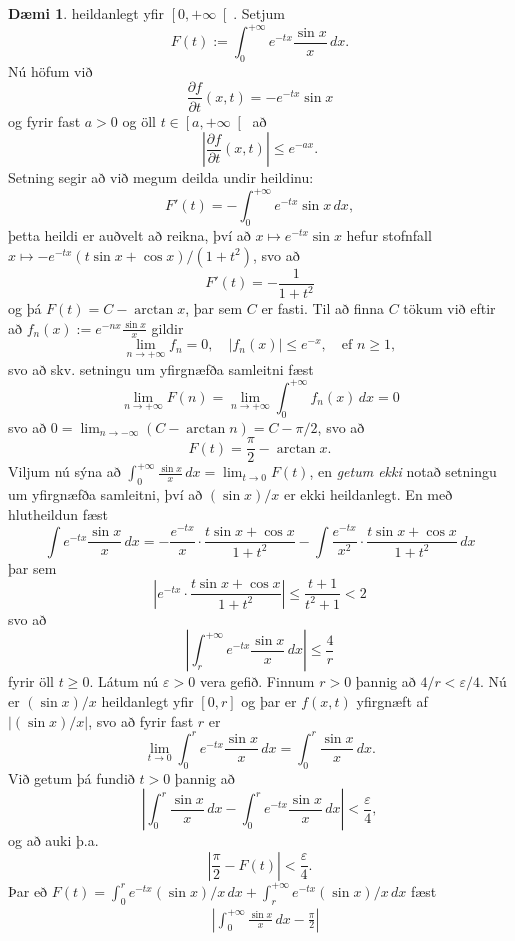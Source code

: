 \documentclass[a4paper,icelandic,11pt]{book}
\theoremstyle{plain}      \newtheorem{setn}{Setning}[chapter]
\theoremstyle{definition} \newtheorem{skilgr}[setn]{Skilgreining}
\newtheorem{daemi}[setn]{Dæmi}
\theoremstyle{remark}     \newtheorem*{ath}{Athugasemd}
\begin{document}
\begin{daemi}
  heildanlegt yfir $\left[0,+\infty\right[$. Setjum
  \[
  F(t) := \int_{0}^{+\infty}e^{-tx}\frac{\sin x}x\,dx.
  \]
  Nú höfum við 
  \[
  \frac{\partial f}{\partial t}(x,t) = -e^{-tx}\sin x
  \]
  og fyrir fast $a>0$ og öll $t\in\left[a,+\infty\right[$ að
  \[
  \left|
    \frac{\partial f}{\partial t}(x,t)
  \right|
  \le e^{-ax}.
  \]
  Setning segir að við megum deilda undir heildinu:
  \[
  F'(t) = -\int_{0}^{+\infty}e^{-tx}\sin x\,dx,
  \]
  þetta heildi er auðvelt að reikna, því að $x\mapsto e^{-tx}\sin x$
  hefur stofnfall $x\mapsto -e^{-tx}(t\sin x + \cos x)/(1+t^{2})$, svo
  að
  \[
  F'(t) = -\frac 1{1+t^{2}}
  \]
  og þá $F(t) = C - \arctan x$, þar sem $C$ er fasti. Til að finna $C$
  tökum við eftir að $f_{n}(x):=e^{-nx}\frac{\sin x}x$ gildir
  \[
  \lim_{n\to+\infty}f_{n} = 0,
  \quad |f_{n}(x)|\le e^{-x},
  \quad \text{ef }n\ge 1,
  \]
  svo að skv. setningu um yfirgnæfða samleitni fæst
  \[
  \lim_{n\to+\infty} F(n)
  = \lim_{n\to+\infty}\int_{0}^{+\infty}f_{n}(x)\,dx
  = 0
  \]
  svo að $0=\lim_{n\to -\infty}(C-\arctan n)=C-\pi/2$, svo að
  \[
  F(t) = \frac \pi2 - \arctan x.
  \]
  Viljum nú sýna að $\int_{0}^{+\infty}\frac{\sin x}x\,dx=\lim_{t\to
    0}F(t)$, en \emph{getum ekki} notað setningu um yfirgnæfða
  samleitni, því að $(\sin x)/x$ er ekki heildanlegt. En með
  hlutheildun fæst
  \[
  \int e^{-tx}\frac{\sin x}x\,dx
  = -\frac{e^{-tx}}x \cdot \frac{t\sin x + \cos x}{1+t^{2}}
  - \int \frac{e^{-tx}}{x^{2}}\cdot \frac{t\sin x + \cos x}{1+t^{2}}\,dx
  \]
  þar sem
  \[
  \left|
    e^{-tx}\cdot
    \frac{t\sin x + \cos x}{1+t^{2}}
  \right|
  \le \frac{t+1}{t^{2}+1}
  < 2
  \]
  svo að
  \[
  \left|
    \int_{r}^{+\infty}e^{-tx}
    \frac{\sin x}x\,dx
  \right|
  \le \frac 4r
  \]
  fyrir öll $t\ge 0$. Látum nú $\varepsilon > 0$ vera gefið. Finnum
  $r>0$ þannig að $4/r < \varepsilon/4$. Nú er $(\sin x)/x$
  heildanlegt yfir $[0,r]$ og þar er $f(x,t)$ yfirgnæft af
  $|(\sin{x})/x|$, svo að fyrir fast $r$ er
  \[
  \lim_{t\to 0}
  \int_{0}^{r}e^{-tx}\frac{\sin x}x\,dx
  = \int_{0}^{r}\frac{\sin x}x\,dx.
  \]
  Við getum þá fundið $t>0$ þannig að
  \[
  \left|
    \int_{0}^{r}\frac{\sin x}x\,dx
    - \int_{0}^{r}e^{-tx}\frac{\sin x}x\,dx
  \right|
  < \frac\varepsilon 4,
  \]
  og að auki þ.a.
  \[
  \left|
    \frac \pi 2 - F(t)
  \right|
  < \frac\varepsilon 4.
  \]
  Þar eð $F(t)=\int_{0}^{r}e^{-tx}(\sin x)/x\,dx +
  \int_{r}^{+\infty}e^{-tx}(\sin x)/x\,dx$ fæst
  \begin{align*}
    &\left|
      \int_{0}^{+\infty}\frac{\sin x}x\,dx - \frac\pi 2
    \right|
    \\

\end{align*}
\end{daemi}
\end{document}
